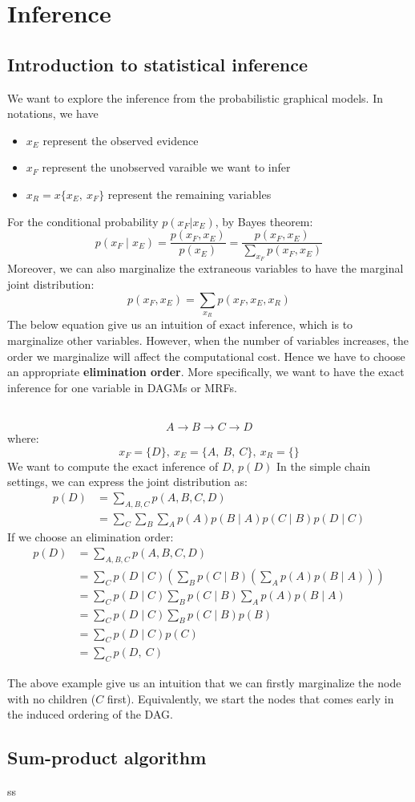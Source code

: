\section{Inference}
\subsection{Introduction to statistical inference}
We want to explore the inference from the probabilistic graphical models. In notations, we have
\begin{itemize}
    \item $x_E$ represent the observed evidence
    \item $x_F$ represent the unobserved varaible we want to infer
    \item $x_R=x\{x_E,\:x_F\}$ represent the remaining variables
\end{itemize} 
For the conditional probability $p(x_F|x_E)$, by Bayes theorem:
$$p\left(x_F \mid x_E\right)=\frac{p\left(x_F, x_E\right)}{p\left(x_E\right)}=\frac{p\left(x_F, x_E\right)}{\sum_{x_F} p\left(x_F, x_E\right)}$$
Moreover, we can also marginalize the extraneous variables to have the marginal joint distribution:
$$p\left(x_F, x_E\right)=\sum_{x_R} p\left(x_F, x_E, x_R\right)$$
The below equation give us an intuition of exact inference, which is to marginalize other variables. However, when the number of variables increases, the order we marginalize will affect the computational cost. Hence we have to choose an appropriate \textbf{elimination order}. More specifically, we want to have the exact inference for one variable in DAGMs or MRFs.
\begin{example}
    \\
    $$A \rightarrow B \rightarrow C \rightarrow D$$
    where:
    $$x_F=\{D\},\:x_E=\{A,\:B,\:C\},\:x_R=\{\}$$
    We want to compute the exact inference of $D$, $p(D)$
    In the simple chain settings, we can express the joint distribution as:
    \begin{align*}
        p(D)&=\sum_{A,B,C}p(A,B,C,D)\\
        &=\sum_C \sum_B \sum_A p(A) p(B \mid A) p(C \mid B) p(D \mid C)
    \end{align*}
    If we choose an elimination order:
    \begin{align*}
        p(D)&=\sum_{A,B,C}p(A,B,C,D)\\
        &=\sum_C p(D \mid C)\left(\sum_B p(C \mid B)\left(\sum_A p(A) p(B \mid A)\right)\right)\\
        &=\sum_C p(D \mid C) \sum_B p(C \mid B) \sum_A p(A) p(B \mid A) \\
        & =\sum_C p(D \mid C) \sum_B p(C \mid B) p(B) \\
        & =\sum_C p(D \mid C) p(C)\\
        & =\sum_C p(D,\:C)
    \end{align*}
\end{example}
The above example give us an intuition that we can firstly marginalize the node with no children ($C$ first). Equivalently, we start the nodes that comes early in the induced ordering of the DAG.
\subsection{Sum-product algorithm}
\begin{example}
    ss
\end{example}